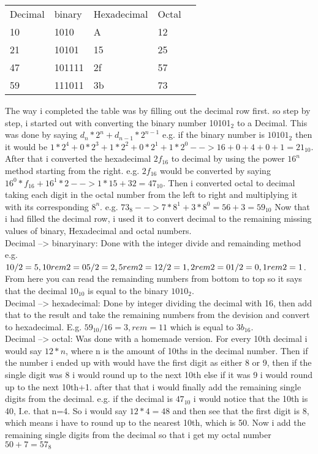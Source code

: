 \documentclass[a4paper]{article}
\begin{document}
    \begin{table}[h!]
        \begin{tabular}{lllll}
        Decimal & binary & Hexadecimal & Octal &  \\
        10      & 1010   & A           & 12    &  \\
        21      & 10101  & 15          & 25    &  \\
        47      & 101111 & 2f          & 57    &  \\
        59      & 111011 & 3b          & 73    & 
        \end{tabular}
        \end{table}
    The way i completed the table was by filling out the decimal row first.
    so step by step, i started out with converting the binary number 10101$_2$ to a Decimal. This was done by saying 
    $d_n*2^n+d_{n-1}*2^{n-1}$ e.g. if the binary number is $10101_2$ then it would be $1*2^4+0*2^3+1*2^2+0*2^1+1*2^0 --> 16+0+4+0+1=21_{10}$.
    After that i converted the hexadecimal $2f_{16}$ to decimal by using the power $16^n$ method starting from the right. e.g. $2f_{16}$ would be converted by saying $16^0*f_{16}+16^1*2-->1*15+32=47_{10}$.
    Then i converted octal to decimal taking each digit in the octal number from the left to right and multiplying it with its corresponding $8^n$. e.g. $73_8-->7*8^1+3*8^0=56+3=59_{10}$
    Now that i had filled the decimal row, i used it to convert decimal to the remaining missing values of binary, Hexadecimal and octal numbers.\\

    Decimal --> binaryinary: Done with the integer divide and remainding method e.g. \\
    $10/2=5, 10rem2=0 \\
     5/2=2, 5rem2=1 \\ 
     2/2=1, 2rem2=0 \\ 
     1/2=0, 1rem2=1$. \\
    From here you can read the remainding numbers from bottom to top so it says that the decimal $10_{10}$ is equal to the binary $1010_2$.\\

    Decimal --> hexadecimal: Done by integer dividing the decimal with 16, then add that to the result and take the remaining numbers from the devision and convert to hexadecimal. E.g. $59_{10}/16=3, rem=11$ which is equal to $3b_{16}$.\\

    Decimal --> octal: Was done with a homemade version. For every 10th decimal i would say $12*n$, where n is the amount of 10ths 
    in the decimal number. Then if the number i ended up with would have the first digit as either 8 or 9, then if the single 
    digit was 8 i would round up to the next 10th else if it was 9 i would round up to the next 10th+1. after that that i would 
    finally add the remaining single digits from the decimal. e.g. if the decimal is $47_{10}$ i would notice that the 10th is 40,
    I.e. that n=4. So i would say $12*4=48$ and then see that the first digit is 8, which means i have to round up to the 
    nearest 10th, which is 50. Now i add the remaining single digits from the decimal so that i get my octal number $50+7=57_8$

    
\end{document}
